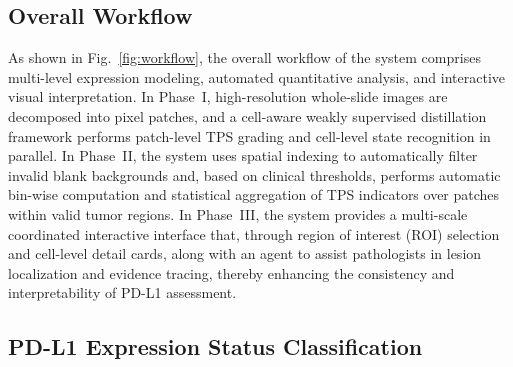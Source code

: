 \documentclass[journal]{vgtc}                     %
\begin{document}
\subsection{Overall Workflow}
As shown in Fig.~\ref{fig:workflow}, the overall workflow of the system comprises multi-level expression modeling, automated quantitative analysis, and interactive visual interpretation. In Phase~I, high-resolution whole-slide images are decomposed into pixel patches, and a cell-aware weakly supervised distillation framework performs patch-level TPS grading and cell-level state recognition in parallel. In Phase~II, the system uses spatial indexing to automatically filter invalid blank backgrounds and, based on clinical thresholds, performs automatic bin-wise computation and statistical aggregation of TPS indicators over patches within valid tumor regions. In Phase~III, the system provides a multi-scale coordinated interactive interface that, through region of interest (ROI) selection and cell-level detail cards, along with an agent to assist pathologists in lesion localization and evidence tracing, thereby enhancing the consistency and interpretability of PD-L1 assessment.

\subsection{PD-L1 Expression Status Classification}
\end{document}
